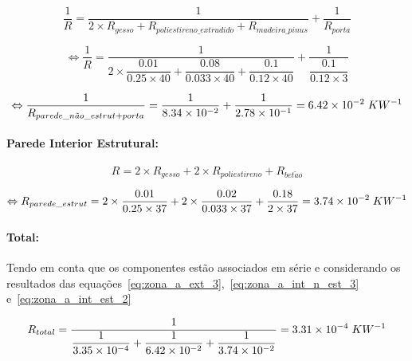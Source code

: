 \documentclass[12pt, a4paper]{article}
\begin{document}
\begin{equation}
    \dfrac{1}{R} =
			\dfrac{1}{
            2 \times R_{gesso} + R_{poliestireno\_extrudido} + R_{madeira\_pinus}
			}
			+
			\dfrac{1}{
				R_{porta}
			}
    \label{eq:zona_a_int_n_est_1}
\end{equation}

\begin{equation}
    \Leftrightarrow \dfrac{1}{R} =
			\dfrac{1}{
            2 \times \dfrac{0.01}{0.25 \times 40} +
            \dfrac{0.08}{0.033 \times 40} +
            \dfrac{0.1}{0.12 \times 40}
        	}
			+
			\dfrac{1}{
            \dfrac{0.1}{0.12 \times 3}
			}
    \label{eq:zona_a_int_n_est_2}
\end{equation}

\begin{equation}
    \Leftrightarrow \dfrac{1}{R_{parede\_n\tilde{a}o\_estrut + porta}} =
	\dfrac{1}{
        8.34 \times 10^{-2}
	} +
	\dfrac{1}{
    	2.78 \times 10^{-1}
	}
	= 6.42 \times 10^{-2} \hspace{1mm} KW^{-1}
    \label{eq:zona_a_int_n_est_3}
\end{equation}

\paragraph{Parede Interior Estrutural:}\label{par:zona_a_int_est}

\begin{equation}
	R= 2 \times R_{gesso} + 2 \times R_{poliestireno} + R_{bet\tilde{a}o}
	\label{eq:zona_a_int_est_1}
\end{equation}

\begin{equation}
	\Leftrightarrow R_{parede\_estrut} =
		2 \times \dfrac{0.01}{0.25 \times 37} +
		2 \times \dfrac{0.02}{0.033 \times 37} +
		\dfrac{0.18}{2 \times 37}
		= 3.74 \times 10^{-2} \hspace{1mm} KW^{-1}
	\label{eq:zona_a_int_est_2}
\end{equation}


\paragraph{Total:}\label{par:zona_a_total} Tendo em conta que os componentes est\~ao
associados em série e considerando os resultados das
equa\c{c}\~oes~\ref*{eq:zona_a_ext_3},~\ref*{eq:zona_a_int_n_est_3} e~\ref*{eq:zona_a_int_est_2}

\begin{equation}
	R_{total} =
	\dfrac{1}{
		\dfrac{1}{
		3.35 \times 10^{-4}
		} +
		\dfrac{1}{
		6.42 \times 10^{-2}
		} +
		\dfrac{1}{
		3.74 \times 10^{-2}
		}
	}
	= 3.31 \times 10^{-4} \hspace{1mm} KW^{-1}
	\label{eq:zona_a_total}
\end{equation}
\end{document}
